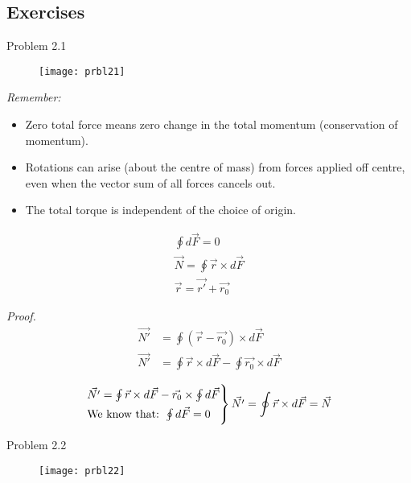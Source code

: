 \subsection{Exercises}

\Large{Problem 2.1}
\label{ex:ex21}

\begin{figure}[H]
        \centering
        \texttt{[image: prbl21]}
        \label{fig:prbl21}
\end{figure}

\textit{Remember:}
\begin{itemize}
	\item Zero total force means zero change in the total momentum (conservation 
of momentum).
	\item Rotations can arise (about the centre of mass) from forces applied off centre, even 
	when the vector sum of all forces cancels out.
	\item The total torque is independent of the choice of origin.
\end{itemize}

\begin{align*}
\oint d\vec{F}  = 0 \\
\vec{N}  = \oint \vec{r} \times d\vec{F} \\
\vec{r}  = \vec{r'} + \vec{r_{0}}
\end{align*}

\textit{Proof.}
\begin{align*}
\vec{N'} & = \oint (\vec{r} - \vec{r_{0}}) \times d \vec{F} \\ 
\vec{N'} & = \oint \vec{r} \times d\vec{F} - \oint \vec{r_0} \times d\vec{F} \\
\end{align*}
\[
\begin{rcases*}
\vec{N'} = \oint \vec{r} \times d\vec{F} - \vec{r_0} \times \oint d\vec{F} \\
\text{We know that: } \oint d\vec{F} = 0 \\
\end{rcases*} \vec{N'} = \oint \vec{r} \times d\vec{F} = \vec{N}
\]

\clearpage

\Large{Problem 2.2}
\label{ex:ex22}

\begin{figure}[H]
        \centering
        \texttt{[image: prbl22]}
        \label{fig:prbl22}
\end{figure}

